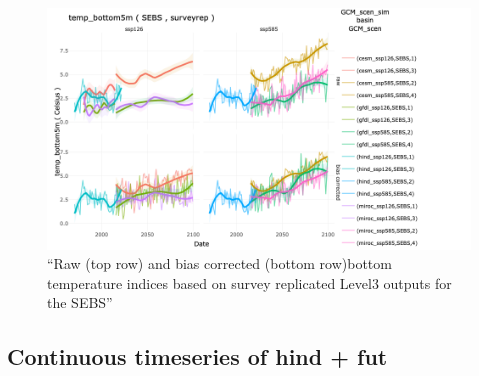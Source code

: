 \documentclass[
]{article}
\newenvironment{Shaded}{\begin{snugshade}}{\end{snugshade}}
\newcommand{\AttributeTok}[1]{\textcolor[rgb]{0.77,0.63,0.00}{#1}}
\newcommand{\CommentTok}[1]{\textcolor[rgb]{0.56,0.35,0.01}{\textit{#1}}}
\newcommand{\FunctionTok}[1]{\textcolor[rgb]{0.00,0.00,0.00}{#1}}
\newcommand{\NormalTok}[1]{#1}
\newcommand{\OtherTok}[1]{\textcolor[rgb]{0.56,0.35,0.01}{#1}}
\newcommand{\SpecialCharTok}[1]{\textcolor[rgb]{0.00,0.00,0.00}{#1}}
\newcommand{\StringTok}[1]{\textcolor[rgb]{0.31,0.60,0.02}{#1}}
\begin{document}
\begin{Shaded}
\end{Shaded}

\begin{figure}
\centering
\includegraphics[width=1\textwidth,height=\textheight]{Figs/biascorrected_temp2.png}
\caption{``Raw (top row) and bias corrected (bottom row)bottom
temperature indices based on survey replicated Level3 outputs for the
SEBS''}
\end{figure}

\hypertarget{continuous-timeseries-of-hind-fut}{%
\subsection{Continuous timeseries of hind +
fut}\label{continuous-timeseries-of-hind-fut}}
\end{document}
